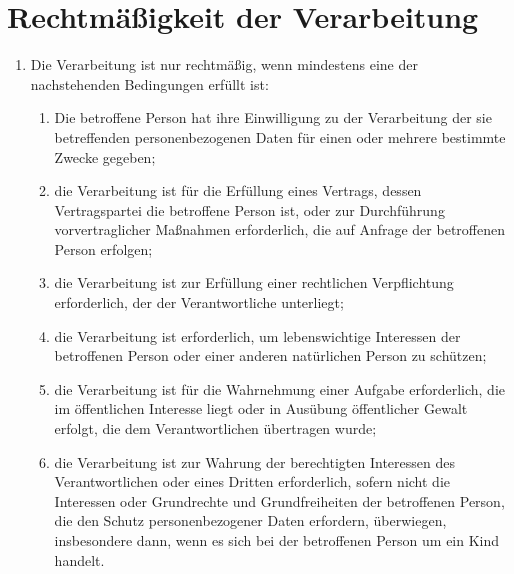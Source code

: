 \chapter{Rechtmäßigkeit der Verarbeitung}
\label{ch:6}


\begin{enumerate}

  \item Die Verarbeitung ist nur rechtmäßig, wenn mindestens eine der nachstehenden Bedingungen erfüllt ist:
  \label{itm:06-1}

  \begin{enumerate}
  
    \item Die betroffene Person hat ihre Einwilligung zu der Verarbeitung der sie betreffenden personenbezogenen Daten
     für einen oder mehrere bestimmte Zwecke gegeben;
    \label{itm:06-1a}

    \item die Verarbeitung ist für die Erfüllung eines Vertrags, dessen Vertragspartei die betroffene Person ist, oder
     zur Durchführung vorvertraglicher Maßnahmen erforderlich, die auf Anfrage der betroffenen Person erfolgen;
    \label{itm:06-1b}

    \item die Verarbeitung ist zur Erfüllung einer rechtlichen Verpflichtung erforderlich, der der Verantwortliche
     unterliegt;
    \label{itm:06-1c}

    \item die Verarbeitung ist erforderlich, um lebenswichtige Interessen der betroffenen Person oder einer anderen
     natürlichen Person zu schützen;
    \label{itm:06-1d}

    \item die Verarbeitung ist für die Wahrnehmung einer Aufgabe erforderlich, die im öffentlichen Interesse liegt oder
     in Ausübung öffentlicher Gewalt erfolgt, die dem Verantwortlichen übertragen wurde;
    \label{itm:06-1e}

    \item die Verarbeitung ist zur Wahrung der berechtigten Interessen des Verantwortlichen oder eines Dritten
     erforderlich, sofern nicht die Interessen oder Grundrechte und Grundfreiheiten der betroffenen Person, die den
     Schutz personenbezogener Daten erfordern, überwiegen, insbesondere dann, wenn es sich bei der betroffenen Person
     um ein Kind handelt.
    \label{itm:06-1f}


\end{enumerate}
\end{enumerate}
